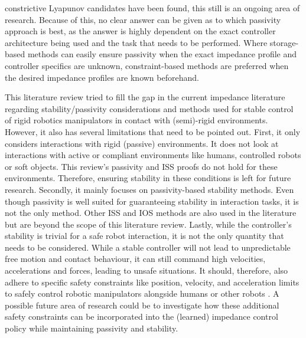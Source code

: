 constrictive Lyapunov candidates have been found, this still is an ongoing area of research. Because of this, no clear answer can be given as to which passivity approach is best, as the answer is highly dependent on the exact controller architecture being used and the task that needs to be performed. Where storage-based methods can easily ensure passivity when the exact impedance profile and controller specifics are unknown, constraint-based methods are preferred when the desired impedance profiles are known beforehand.

This literature review tried to fill the gap in the current impedance literature regarding stability/passivity considerations and methods used for stable control of rigid robotics manipulators in contact with (semi)-rigid environments. However, it also has several limitations that need to be pointed out. First, it only considers interactions with rigid (passive) environments. It does not look at interactions with active or compliant environments like humans, controlled robots or soft objects. This review's passivity and ISS proofs do not hold for these environments. Therefore, ensuring stability in these conditions is left for future research. Secondly, it mainly focuses on passivity-based stability methods. Even though passivity is well suited for guaranteeing stability in interaction tasks, it is not the only method. Other ISS and IOS methods are also used in the literature but are beyond the scope of this literature review. Lastly, while the controller's stability is trivial for a safe robot interaction, it is not the only quantity that needs to be considered. While a stable controller will not lead to unpredictable free motion and contact behaviour, it can still command high velocities, accelerations and forces, leading to unsafe situations. It should, therefore, also adhere to specific safety constraints like position, velocity, and acceleration limits to safely control robotic manipulators alongside humans or other robots \cite{lasotaSurveyMethodsSafe2017,chowLyapunovbasedApproachSafe2018,sadanandananandSafeLearningControl2021,sharkawyHumanRobotInteraction2022}. A possible future area of research could be to investigate how these additional safety constraints can be incorporated into the (learned) impedance control policy while maintaining passivity and stability.
